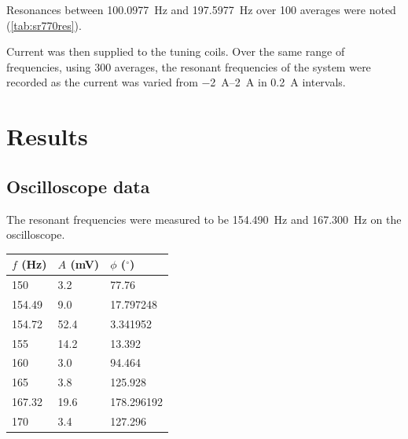\documentclass{article}
\begin{document}
Resonances between \qty{100.0977}{Hz} and \qty{197.5977}{Hz} over 100 averages were noted (\autoref{tab:sr770res}).

Current was then supplied to the tuning coils. Over the same range of frequencies, using 300 averages, the resonant frequencies of the system were recorded as the current was varied from \qtyrange{-2}{2}{\ampere} in \qty{0.2}{\ampere} intervals.

\section{Results}

\subsection{Oscilloscope data}
The resonant frequencies were measured to be \qty{154.490}{Hz} and \qty{167.300}{Hz} on the oscilloscope.

\begin{table}
	\centering
  \begin{tabular}{@{}lll@{}}
    \toprule
    $f$ (\unit{Hz}) & $A$ (\unit{\mV}) & $\phi$ ($^\circ$) \\ \midrule
    150    & 3.2      & 77.76      \\
    154.49 & 9.0      & 17.797248  \\
    154.72 & 52.4     & 3.341952   \\
    155    & 14.2     & 13.392     \\
    160    & 3.0      & 94.464     \\
    165    & 3.8      & 125.928    \\
    167.32 & 19.6     & 178.296192 \\
    170    & 3.4      & 127.296    \\ \bottomrule
  \end{tabular}
\end{table}
\end{document}
